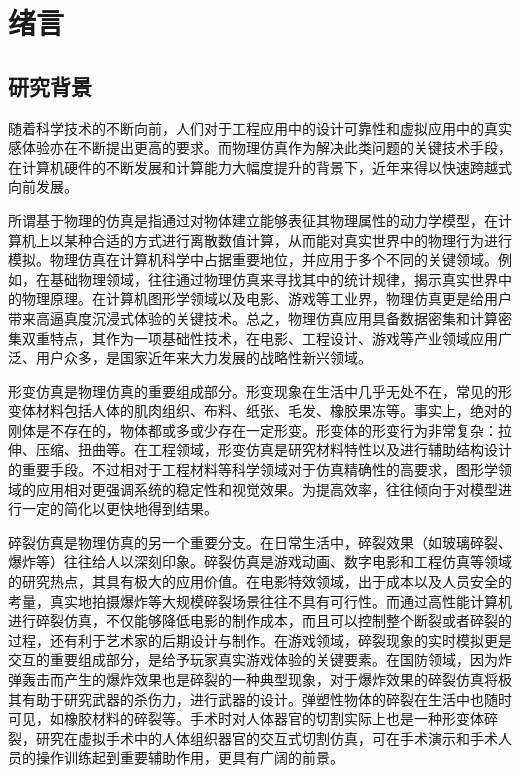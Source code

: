\chapter{绪言}
\label{chap1_introduction}
\section{研究背景}
随着科学技术的不断向前，人们对于工程应用中的设计可靠性和虚拟应用中的真实感体验亦在不断提出更高的要求。而物理仿真作为解决此类问题的关键技术手段，在计算机硬件的不断发展和计算能力大幅度提升的背景下，近年来得以快速跨越式向前发展。

所谓基于物理的仿真是指通过对物体建立能够表征其物理属性的动力学模型，在计算机上以某种合适的方式进行离散数值计算，从而能对真实世界中的物理行为进行模拟。物理仿真在计算机科学中占据重要地位，并应用于多个不同的关键领域。例如，在基础物理领域，往往通过物理仿真来寻找其中的统计规律，揭示真实世界中的物理原理。在计算机图形学领域以及电影、游戏等工业界，物理仿真更是给用户带来高逼真度沉浸式体验的关键技术。总之，物理仿真应用具备数据密集和计算密集双重特点，其作为一项基础性技术，在电影、工程设计、游戏等产业领域应用广泛、用户众多，是国家近年来大力发展的战略性新兴领域。

形变仿真是物理仿真的重要组成部分。形变现象在生活中几乎无处不在，常见的形变体材料包括人体的肌肉组织、布料、纸张、毛发、橡胶果冻等。事实上，绝对的刚体是不存在的，物体都或多或少存在一定形变。形变体的形变行为非常复杂：拉伸、压缩、扭曲等。在工程领域，形变仿真是研究材料特性以及进行辅助结构设计的重要手段。不过相对于工程材料等科学领域对于仿真精确性的高要求，图形学领域的应用相对更强调系统的稳定性和视觉效果。为提高效率，往往倾向于对模型进行一定的简化以更快地得到结果。

碎裂仿真是物理仿真的另一个重要分支。在日常生活中，碎裂效果（如玻璃碎裂、爆炸等）往往给人以深刻印象。碎裂仿真是游戏动画、数字电影和工程仿真等领域的研究热点，其具有极大的应用价值。在电影特效领域，出于成本以及人员安全的考量，真实地拍摄爆炸等大规模碎裂场景往往不具有可行性。而通过高性能计算机进行碎裂仿真，不仅能够降低电影的制作成本，而且可以控制整个断裂或者碎裂的过程，还有利于艺术家的后期设计与制作。在游戏领域，碎裂现象的实时模拟更是交互的重要组成部分，是给予玩家真实游戏体验的关键要素。在国防领域，因为炸弹轰击而产生的爆炸效果也是碎裂的一种典型现象，对于爆炸效果的碎裂仿真将极其有助于研究武器的杀伤力，进行武器的设计。弹塑性物体的碎裂在生活中也随时可见，如橡胶材料的碎裂等。手术时对人体器官的切割实际上也是一种形变体碎裂，研究在虚拟手术中的人体组织器官的交互式切割仿真，可在手术演示和手术人员的操作训练起到重要辅助作用，更具有广阔的前景。


